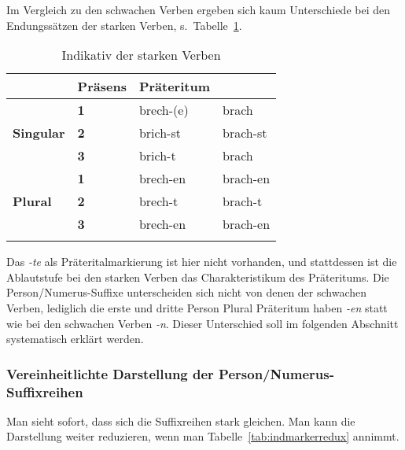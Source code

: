 \label{sec:stvind}

Im Vergleich zu den schwachen Verben ergeben sich kaum Unterschiede bei den Endungssätzen der starken Verben, s.\ Tabelle~\ref{tab:stvind}.

\begin{table}
  \centering
  \begin{tabular}{llll}
    \lsptoprule
    \multicolumn{2}{c}{} & \textbf{Präsens} & \textbf{Präteritum} \\
    \midrule
    \multirow{3}{*}{\textbf{Singular}} & \textbf{1} & brech-(e) & brach \\
    & \textbf{2} & brich-st & brach-st \\
    & \textbf{3} & brich-t & brach \\
    \midrule
    \multirow{3}{*}{\textbf{Plural}} & \textbf{1} & brech-en & brach-en \\
    & \textbf{2} & brech-t & brach-t \\
    & \textbf{3} & brech-en & brach-en \\
    \lspbottomrule
  \end{tabular}
  \caption{Indikativ der starken Verben}
  \label{tab:stvind}
\end{table}


Das \textit{-te} als Präteritalmarkierung ist hier nicht vorhanden, und stattdessen ist die Ablautstufe bei den starken Verben das Charakteristikum des Präteritums.
Die Person\slash Numerus-Suffixe unterscheiden sich nicht von denen der schwachen Verben, lediglich die erste und dritte Person Plural Präteritum haben \textit{-en} statt wie bei den schwachen Verben \textit{-n}.
Dieser Unterschied soll im folgenden Abschnitt systematisch erklärt werden.

\subsubsection{Vereinheitlichte Darstellung der Person\slash Numerus-Suffixreihen}

Man sieht sofort, dass sich die Suffixreihen stark gleichen.
Man kann die Darstellung weiter reduzieren, wenn man Tabelle~\ref{tab:indmarkerredux} annimmt.


